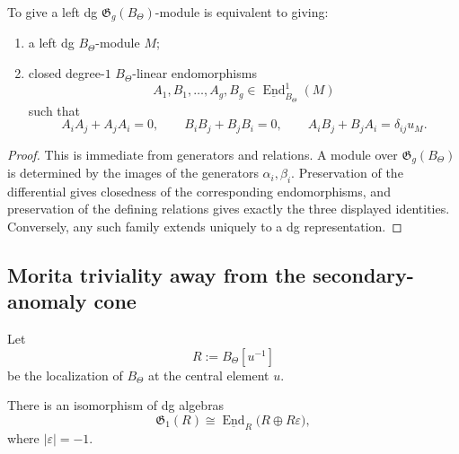 \begin{theorem}
\label{thm:tholog-universal-property-genus}
To give a left dg \(\mathfrak{G}_{g}(B_{\Theta})\)-module is equivalent to giving:
\begin{enumerate}
\item a left dg \(B_{\Theta}\)-module \(M\);
\item closed degree-\(1\) \(B_{\Theta}\)-linear endomorphisms
\[
A_{1},B_{1},\dots,A_{g},B_{g}\in \underline{\operatorname{End}}^{1}_{B_{\Theta}}(M)
\]
such that
\[
A_{i}A_{j}+A_{j}A_{i}=0,\qquad
B_{i}B_{j}+B_{j}B_{i}=0,\qquad
A_{i}B_{j}+B_{j}A_{i}=\delta_{ij}u_{M}.
\]
\end{enumerate}
\end{theorem}

\begin{proof}
This is immediate from generators and relations.
A module over \(\mathfrak{G}_{g}(B_{\Theta})\) is determined by the images of the generators
\(\alpha_{i},\beta_{i}\).
Preservation of the differential gives closedness of the corresponding endomorphisms, and preservation of the defining relations gives exactly the three displayed identities.
Conversely, any such family extends uniquely to a dg representation.
\end{proof}

\subsection{Morita triviality away from the secondary-anomaly cone}
\label{subsec:tholog-morita-triviality}

Let
\[
R:=B_{\Theta}[u^{-1}]
\]
be the localization of \(B_{\Theta}\) at the central element \(u\).

\begin{theorem}
\label{thm:tholog-one-handle-matrix}
There is an isomorphism of dg algebras
\[
\mathfrak{G}_{1}(R)\cong \underline{\operatorname{End}}_{R}
\big(R\oplus R\varepsilon\big),
\]
where \(|\varepsilon|=-1\).
\end{theorem}


